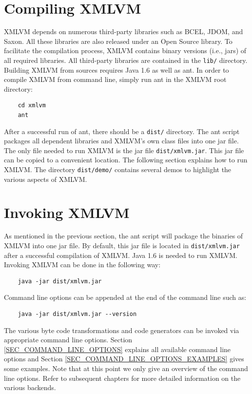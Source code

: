 \documentclass[11pt]{book}
\begin{document}
\section{Compiling XMLVM}
\label{SEC_COMPILING_XMLVM}

XMLVM depends on numerous third-party libraries such as BCEL, JDOM, and
Saxon. All these libraries are also released under an Open Source
library. To facilitate the compilation process, XMLVM contains binary
versions (i.e., jars) of all required libraries. All third-party
libraries are contained in the \texttt{lib/} directory. Building XMLVM
from sources requires Java 1.6 as well as ant. In order to compile
XMLVM from command line, simply run ant in the XMLVM root directory:

\begin{verbatim}
    cd xmlvm
    ant
\end{verbatim}

After a successful run of ant, there should be a \texttt{dist/}
directory. The ant script packages all dependent libraries and XMLVM's
own class files into one jar file. The only file needed to run XMLVM
is the jar file \texttt{dist/xmlvm.jar}. This jar file can be copied
to a convenient location. The following section explains how to run
XMLVM. The directory \texttt{dist/demo/} contains several demos to
highlight the various aspects of XMLVM.


\section{Invoking XMLVM}
\label{SEC_INVOKING_XMLVM}

As mentioned in the previous section, the ant script will package the
binaries of XMLVM into one jar file. By default, this jar file is
located in \texttt{dist/xmlvm.jar} after a successful compilation of
XMLVM. Java 1.6 is needed to run XMLVM. Invoking XMLVM can be done in
the following way:

\begin{verbatim}
    java -jar dist/xmlvm.jar
\end{verbatim}

Command line options can be appended at the end of the command line
such as:

\begin{verbatim}
    java -jar dist/xmlvm.jar --version
\end{verbatim}

The various byte code transformations and code generators can be
invoked via appropriate command line options. Section
\ref{SEC_COMMAND_LINE_OPTIONS} explains all available command line
options and Section \ref{SEC_COMMAND_LINE_OPTIONS_EXAMPLES} gives some
examples. Note that at this point we only give an overview of the
command line options. Refer to subsequent chapters for more detailed
information on the various backends.
\end{document}

